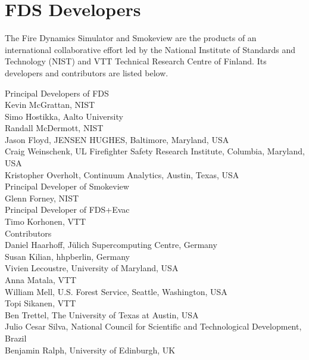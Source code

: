 \chapter{FDS Developers}

The Fire Dynamics Simulator and Smokeview are the products of an international collaborative effort led by
the National Institute of Standards and Technology (NIST) and VTT Technical Research Centre of Finland. Its developers and
contributors are listed below.

\vspace{0.3in}

\begin{flushleft}

Principal Developers of FDS  \\ [0.2in]

Kevin McGrattan, NIST \\
Simo Hostikka, Aalto University \\
Randall McDermott, NIST \\
Jason Floyd, JENSEN HUGHES, Baltimore, Maryland, USA \\
Craig Weinschenk, UL Firefighter Safety Research Institute, Columbia, Maryland, USA \\
Kristopher Overholt, Continuum Analytics, Austin, Texas, USA \\ [0.3in]

Principal Developer of Smokeview  \\ [0.2in]

Glenn Forney, NIST \\ [0.3in]

Principal Developer of FDS+Evac  \\ [0.2in]

Timo Korhonen, VTT \\ [0.3in]

Contributors \\ [0.2in]

Daniel Haarhoff, J\"ulich Supercomputing Centre, Germany \\
Susan Kilian, hhpberlin, Germany \\
Vivien Lecoustre, University of Maryland, USA \\
Anna Matala, VTT \\
William Mell, U.S. Forest Service, Seattle, Washington, USA \\
Topi Sikanen, VTT \\
Ben Trettel, The University of Texas at Austin, USA \\
Julio Cesar Silva, National Council for Scientific and Technological Development, Brazil \\
Benjamin Ralph, University of Edinburgh, UK

\end{flushleft}


